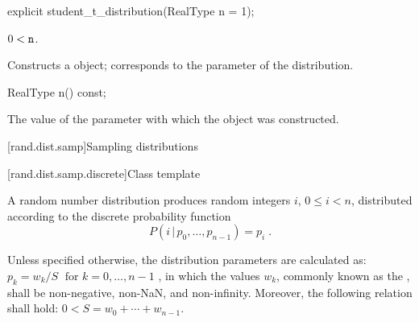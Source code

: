 %
\begin{itemdecl}
explicit student_t_distribution(RealType n = 1);
\end{itemdecl}

\begin{itemdescr}
\pnum\requires
 $ 0 < \texttt{\protect n} $.

\pnum\effects Constructs a  object;
  corresponds to the parameter of the distribution.
\end{itemdescr}

%
\begin{itemdecl}
RealType n() const;
\end{itemdecl}

\begin{itemdescr}
\pnum\returns The value of the  parameter
 with which the object was constructed.
\end{itemdescr}%
%



[rand.dist.samp]{Sampling distributions}%
%



[rand.dist.samp.discrete]{Class template }%
%
%

\pnum
A  random number distribution
produces random integers $i$, $0 \leq i < n$,
distributed according to
the discrete probability function%
%
%
\[%
 P(i\,|\,p_0,\ldots,p_{n-1})
      = p_i
\; \mbox{.}
\]

\pnum
Unless specified otherwise,
the distribution parameters are calculated as:
 $p_k = {w_k / S} \; \mbox{  for } k = 0, \ldots, n\!-\!1$ ,
in which
the values $w_k$,
commonly known as the %
%
%
, shall be non-negative, non-NaN, and non-infinity.
Moreover, the following relation shall hold:
 $ 0 < S = w_0 + \cdots + w_{n-1} $.

